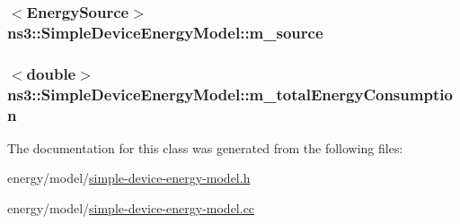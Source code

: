 \subsubsection[{\texorpdfstring{m\+\_\+source}{m_source}}]{$<${\bf Energy\+Source}$>$ ns3\+::\+Simple\+Device\+Energy\+Model\+::m\+\_\+source\hspace{0.3cm}{\ttfamily [private]}}\hypertarget{classns3_1_1SimpleDeviceEnergyModel_af957a6ef8ed0a7bde46045a501c4a587}{}\label{classns3_1_1SimpleDeviceEnergyModel_af957a6ef8ed0a7bde46045a501c4a587}
\subsubsection[{\texorpdfstring{m\+\_\+total\+Energy\+Consumption}{m_totalEnergyConsumption}}]{$<$double$>$ ns3\+::\+Simple\+Device\+Energy\+Model\+::m\+\_\+total\+Energy\+Consumption\hspace{0.3cm}{\ttfamily [private]}}\hypertarget{classns3_1_1SimpleDeviceEnergyModel_a55d76bff70f464f11d37e99d8f7ce4b9}{}\label{classns3_1_1SimpleDeviceEnergyModel_a55d76bff70f464f11d37e99d8f7ce4b9}


The documentation for this class was generated from the following files\+:\begin{DoxyCompactItemize}
\item 
energy/model/\hyperlink{simple-device-energy-model_8h}{simple-\/device-\/energy-\/model.\+h}\item 
energy/model/\hyperlink{simple-device-energy-model_8cc}{simple-\/device-\/energy-\/model.\+cc}\end{DoxyCompactItemize}
